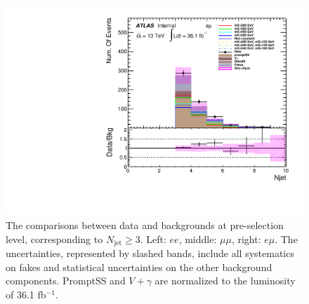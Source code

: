 \begin{figure}[h]
\begin{minipage}[t]{0.33\linewidth}
\end{minipage}
\begin{minipage}[t]{0.33\linewidth}
\centering
\includegraphics[width=1.0\textwidth,angle=-90]{fig/dataMC_high_Njet_CR/numOfjet_emu.pdf}
\end{minipage} \caption{The comparisons between data and backgrounds at pre-selection level, corresponding to $N_{\text{jet}}\geq3$. Left: $ee$, middle: $\mu\mu$, right: $e\mu$. The uncertainties, represented by slashed bands, include all systematics on fakes and statistical uncertainties on the other background components. PromptSS and $V+\gamma$ are normalized to the luminosity of 36.1 fb$^{-1}$.}
\label{fig:dataMC_high_Njet_CR:numOfjet}
\end{figure}
